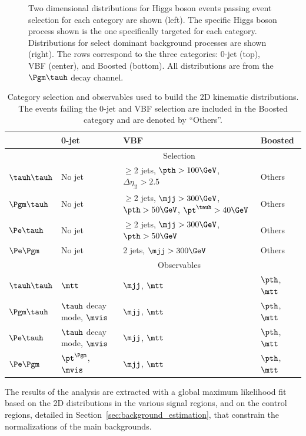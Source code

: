 \begin{figure}[htbp]
     \caption{Two dimensional distributions for Higgs boson events passing event selection 
for each category are shown (left). The specific Higgs boson process shown is the one 
specifically targeted for each category. Distributions for select dominant background 
processes are shown (right). The rows correspond to the three categories: 0-jet (top), 
VBF (center), and Boosted (bottom). All distributions are from the $\Pgm\tauh$ decay channel.} 
\end{figure}


\begin{table}
\centering
\begin{small}
\begin{tabular}{llll}
 & 0-jet & VBF & Boosted \\
\hline
 & \multicolumn{3}{c}{Selection} \\ \cline{2-4}
$\tauh\tauh$ & No jet &  \scriptsize{$\geq$2 jets, $\pth>100\GeV$, $\Delta\eta_{\mathrm{jj}}>2.5$} & Others\\
$\Pgm\tauh$ & No jet &  \scriptsize{$\geq$2 jets, $\mjj>300\GeV$, $\pth>50\GeV$, $\pt^{\tauh}>40\GeV$} & Others\\
$\Pe\tauh$ & No jet &  \scriptsize{$\geq$2 jets, $\mjj>300\GeV$, $\pth>50\GeV$} & Others\\
$\Pe\Pgm$ & No jet & \scriptsize{2 jets, $\mjj>300\GeV$} & Others \\
\hline
 & \multicolumn{3}{c}{Observables}\\ \cline{2-4}
$\tauh\tauh$ & $\mtt$                 &    $\mjj$, $\mtt$  &   $\pth$, $\mtt$  \\
$\Pgm\tauh$ & $\tauh$ decay mode, $\mvis$   &    $\mjj$, $\mtt$  &  $\pth$, $\mtt$  \\
$\Pe\tauh$ & $\tauh$ decay mode, $\mvis$   &    $\mjj$, $\mtt$  &  $\pth$, $\mtt$ \\
$\Pe\Pgm$ & $\pt^{\Pgm}$, $\mvis$   &     $\mjj$, $\mtt$  &   $\pth$, $\mtt$  \\
\hline
\end{tabular}
\caption{ Category selection and observables used to build the 2D kinematic distributions. 
The events failing the 0-jet and VBF selection are included in the Boosted category and are
denoted by ``Others''.
\label{tab:htt_categories}
}
\end{small}
\end{table}

The results of the analysis are extracted with a global maximum likelihood fit based on the 
2D distributions in the various signal regions, and on the control regions, detailed in 
Section~\ref{sec:background_estimation}, that constrain the normalizations of the main backgrounds.

